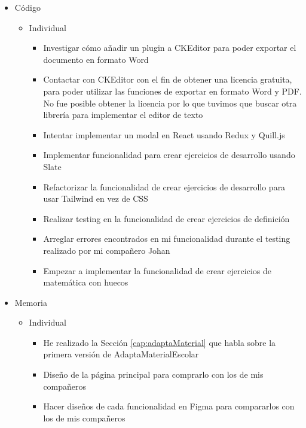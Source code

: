 \begin{itemize}
    \item Código
          \begin{itemize}
              \item Individual
                    \begin{itemize}
                        \item Investigar cómo añadir un plugin a CKEditor para poder exportar el documento en formato Word
                        \item Contactar con CKEditor con el fin de obtener una licencia gratuita, para poder utilizar las funciones de exportar en formato Word y PDF. No fue posible obtener la licencia por lo que tuvimos que buscar otra librería para implementar el editor de texto
                        \item Intentar implementar un modal en React usando Redux y Quill.js
                        \item Implementar funcionalidad para crear ejercicios de desarrollo usando Slate
                        \item Refactorizar la funcionalidad de crear ejercicios de desarrollo para usar Tailwind en vez de CSS
                        \item Realizar testing en la funcionalidad de crear ejercicios de definición
                        \item Arreglar errores encontrados en mi funcionalidad durante el testing realizado por mi compañero Johan
                        \item Empezar a implementar la funcionalidad de crear ejercicios de matemática con huecos
                    \end{itemize}
          \end{itemize}
    \item Memoria
          \begin{itemize}
              \item Individual
                    \begin{itemize}
                        \item He realizado la Sección \ref{cap:adaptaMaterial} que habla sobre la primera versión de AdaptaMaterialEscolar
                        \item Diseño de la página principal para comprarlo con los de mis compañeros
                        \item Hacer diseños de cada funcionalidad en Figma para compararlos con los de mis compañeros

\end{itemize}
\end{itemize}
\end{itemize}

